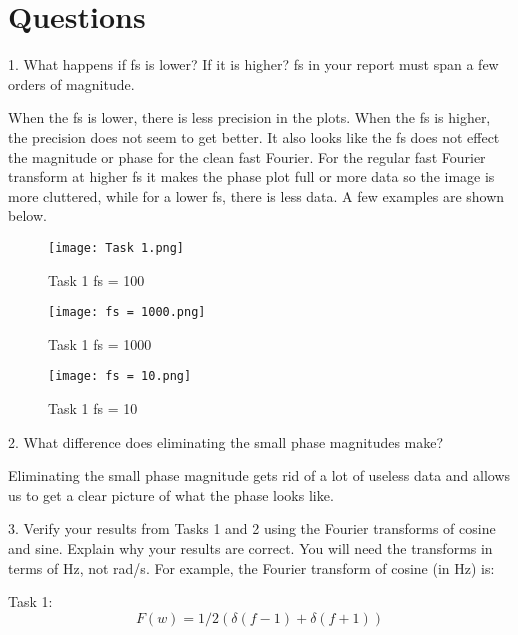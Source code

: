 \documentclass[11pt,a4]{report}
\begin{document}
\section{Questions}
1. What happens if fs is lower? If it is higher? fs in your report must span a few orders of
magnitude.

When the fs is lower, there is less precision in the plots. When the fs is higher, the precision does not seem to get better. It also looks like the fs does not effect the magnitude or phase for the clean fast Fourier. For the regular fast Fourier transform at higher fs it makes the phase plot full or more data so the image is more cluttered, while for a lower fs, there is less data. A few examples are shown below. 

\begin{figure}[h!]
    \begin{center}
  \caption{Task 1 fs = 100}
  \texttt{[image: Task 1.png]}
\end{center}
\end{figure}
\newpage

\begin{figure}[h!]
    \begin{center}
  \caption{Task 1 fs = 1000}
  \texttt{[image: fs = 1000.png]}
\end{center}
\end{figure}

\begin{figure}[h!]
    \begin{center}
  \caption{Task 1 fs = 10}
  \texttt{[image: fs = 10.png]}
\end{center}
\end{figure}



2. What difference does eliminating the small phase magnitudes make?

Eliminating the small phase magnitude gets rid of a lot of useless data and allows us to get a clear picture of what the phase looks like. 


3. Verify your results from Tasks 1 and 2 using the Fourier transforms of cosine and sine.
Explain why your results are correct. You will need the transforms in terms of Hz, not rad/s.
For example, the Fourier transform of cosine (in Hz) is:

Task 1:
\begin{equation}
F(w) = 1/2(\delta(f-1)+\delta(f+1))    
\end{equation}
\end{document}
